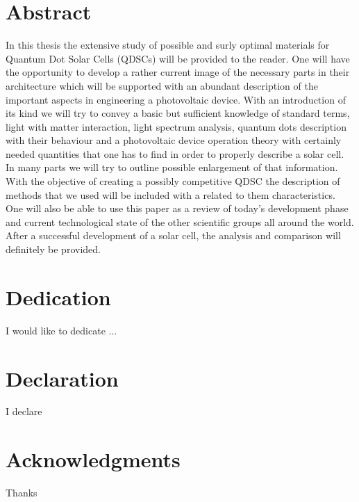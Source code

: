 \documentclass[12pt,twoside]{report}
\numberwithin{equation}{subsection}
\begin{document}
\graphicspath{ {images/} }


\chapter*{Abstract}
In this thesis the extensive study of possible and surly optimal materials for Quantum Dot Solar Cells (QDSCs) will be provided to the reader. One will have the opportunity to develop a rather current image of the necessary parts in their architecture which will be supported with an abundant description of the important aspects in engineering a photovoltaic device. With an introduction of its kind we will try to convey a basic but sufficient knowledge of standard terms, light with matter interaction, light spectrum analysis, quantum dots description with their behaviour and a photovoltaic device operation theory with certainly needed quantities that one has to find in order to properly describe a solar cell. In many parts we will try to outline possible enlargement of that information. With the objective of creating a possibly competitive QDSC the description of methods that we used will be included with a related to them characteristics. One will also be able to use this paper as a review of today’s development phase and current technological state of the other scientific groups all around the world.  After a successful development of a solar cell, the analysis and comparison will definitely be provided.
 
\chapter*{Dedication}
I would like to dedicate ...

\chapter*{Declaration}
I declare

\chapter*{Acknowledgments}
Thanks 

\tableofcontents
\listoffigures 
\listoftables





\printbibliography
\end{document}
